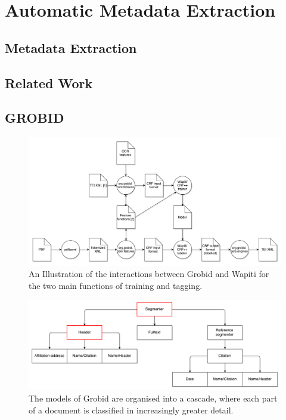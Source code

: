 
\chapter{Automatic Metadata Extraction} %

\label{Chapter3} %



\section{Metadata Extraction}
\section{Related Work}
\section{GROBID}

\begin{figure}[!ht]
\center
\includegraphics[width=6in]{Figures/grobid.pdf}
\caption{An Illustration of the interactions between Grobid and Wapiti for the two main functions of training and tagging.}
\label{fig:HMM}
\end{figure}

\begin{figure}[!ht]
\center
\includegraphics[width=6in]{Figures/cascade.pdf}
\caption{The models of Grobid are organised into a cascade, where each part of a document is classified in increasingly greater detail.}
\label{fig:HMM}
\end{figure}